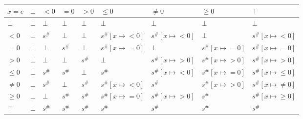 \documentclass{article}
\begin{document}
    \begin{table}[]
        \begin{tabular}{|l|l|l|l|l|l|l|l|l|}
        \hline
        $x = e$ & $\bot$ & $<0$   & $=0$   & $>0$   & $\le 0$              & $\ne 0$              & $\ge 0$              & $\top$                  \\ \hline
        $\bot$  & $\bot$ & $\bot$ & $\bot$ & $\bot$ & $\bot$               & $\bot$               & $\bot$               & $\bot$                  \\ \hline
        $<0$    & $\bot$ & $s^\#$ & $\bot$ & $\bot$ & $s^\#[x \mapsto <0]$ & $s^\#[x \mapsto <0]$ & $\bot$               & $s^\#[x \mapsto <0]$    \\ \hline
        $=0$    & $\bot$ & $\bot$ & $s^\#$ & $\bot$ & $s^\#[x \mapsto =0]$ & $\bot$               & $s^\#[x \mapsto =0]$ & $s^\#[x \mapsto =0]$    \\ \hline
        $>0$    & $\bot$ & $\bot$ & $\bot$ & $s^\#$ & $\bot$               & $s^\#[x \mapsto >0]$ & $s^\#[x \mapsto >0]$ & $s^\#[x \mapsto >0]$    \\ \hline
        $\le 0$ & $\bot$ & $s^\#$ & $s^\#$ & $\bot$ & $s^\#$               & $s^\#[x \mapsto <0]$ & $s^\#[x \mapsto =0]$ & $s^\#[x \mapsto \le 0]$ \\ \hline
        $\ne 0$ & $\bot$ & $s^\#$ & $\bot$ & $s^\#$ & $s^\#[x \mapsto <0]$ & $s^\#$               & $s^\#[x \mapsto >0]$ & $s^\#[x \mapsto \ne 0]$ \\ \hline
        $\ge 0$ & $\bot$ & $\bot$ & $s^\#$ & $s^\#$ & $s^\#[x \mapsto =0]$ & $s^\#[x \mapsto >0]$ & $s^\#$               & $s^\#[x \mapsto \ge 0]$ \\ \hline
        $\top$  & $\bot$ & $s^\#$ & $s^\#$ & $s^\#$ & $s^\#$               & $s^\#$               & $s^\#$               & $s^\#$                  \\ \hline
        \end{tabular}
        \end{table}
        
\end{document}
